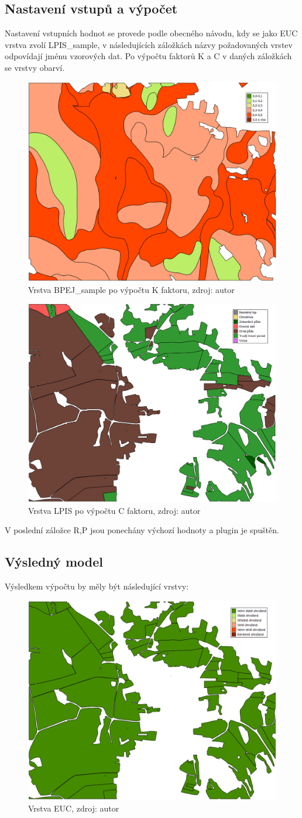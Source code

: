 \subsection{Nastavení vstupů a výpočet}
Nastavení vstupních hodnot se provede podle obecného návodu, kdy se jako EUC vrstva zvolí LPIS\_sample, v následujících záložkách názvy požadovaných vrstev odpovídají jménu vzorových dat. Po výpočtu faktorů K a C v daných záložkách se vrstvy obarví.
\begin{figure}[H] \centering
		\includegraphics[width=.5\textwidth]{./pictures/bpej_layer2.png}
		\caption[Vrstva BPEJ\_sample po výpočtu K faktoru]{Vrstva BPEJ\_sample po výpočtu K faktoru, zdroj: autor}
		\label{bpej_sample2}
\end{figure}
\begin{figure}[H] \centering
		\includegraphics[width=.5\textwidth]{./pictures/lpis_layer2.png}
		\caption[Vrstva LPIS po výpočtu C faktoru]{Vrstva LPIS po výpočtu C faktoru, zdroj: autor}
		\label{lpis_sample2}
\end{figure}
V poslední záložce R,P jsou ponechány výchozí hodnoty a plugin je spuštěn.
\newpage
\subsection{Výsledný model}
Výsledkem výpočtu by měly být následující vrstvy:
\begin{figure}[H] \centering
		\includegraphics[width=.5\textwidth]{./pictures/euc_layer.png}
		\caption[Vrstva EUC]{Vrstva EUC, zdroj: autor}
		\label{euc_sample}
\end{figure}
